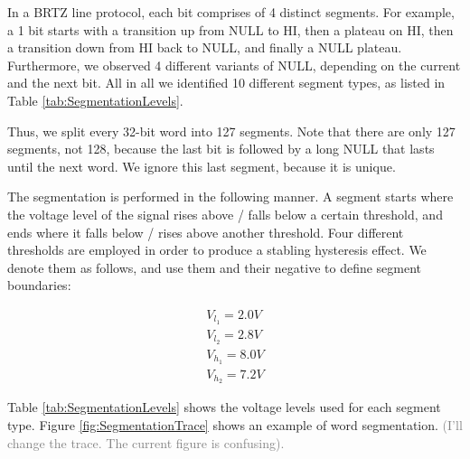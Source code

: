 \documentclass[conference]{IEEEtran}
\begin{document}
  In a BRTZ line protocol, each bit comprises of 4 distinct segments. For example, a 1 bit starts with a transition up from NULL to HI, then a plateau on HI, then a transition down from HI back to NULL, and finally a NULL plateau. Furthermore, we observed 4 different variants of NULL, depending on the current and the next bit. All in all we identified 10 different segment types, as listed in Table \ref{tab:SegmentationLevels}.
  
  Thus, we split every 32-bit word into 127 segments. Note that there are only 127 segments, not 128, because the last bit is followed by a long NULL that lasts until the next word. We ignore this last segment, because it is unique.
  
  The segmentation is performed in the following manner. A segment starts where the voltage level of the signal rises above / falls below a certain threshold, and ends where it falls below / rises above another threshold. Four different thresholds are employed in order to produce a stabling hysteresis effect. We denote them as follows, and use them and their negative to define segment boundaries:
  
  \begin{align*}
    V_{l_1} = 2.0V \\
    V_{l_2} = 2.8V \\
    V_{h_1} = 8.0V \\
    V_{h_2} = 7.2V 
  \end{align*}
  
  Table \ref{tab:SegmentationLevels} shows the voltage levels used for each segment type. Figure \ref{fig:SegmentationTrace} shows an example of word segmentation. \textcolor{gray}{(I'll change the trace. The current figure is confusing).}
  
\end{document}
